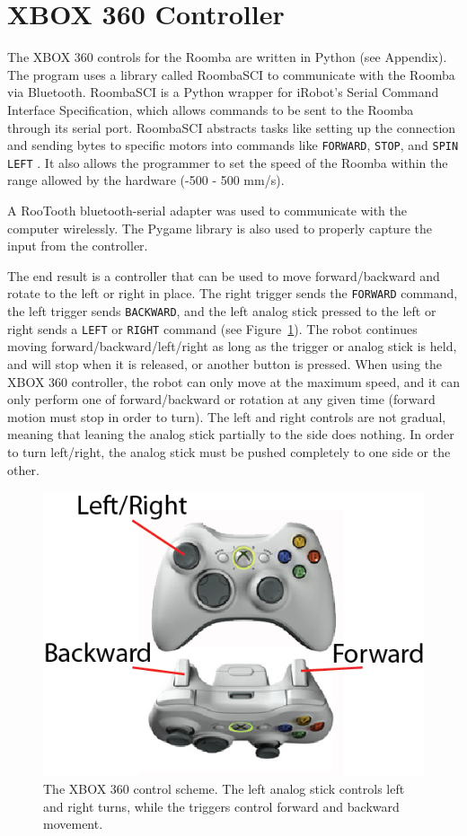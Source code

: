 \documentclass[12pt, letterpaper]{report}
\begin{document}
\section{XBOX 360 Controller}
The XBOX 360 controls for the Roomba are written in Python (see Appendix). The program uses a library called RoombaSCI to communicate with the Roomba via Bluetooth. RoombaSCI is a Python wrapper for iRobot's Serial Command Interface Specification, which allows commands to be sent to the Roomba through its serial port. RoombaSCI abstracts tasks like setting up the connection and sending bytes to specific motors into commands like \texttt{FORWARD}, \texttt{STOP}, and \texttt{SPIN LEFT} \cite{RoombaSCI}. It also allows the programmer to set the speed of the Roomba within the range allowed by the hardware (-500 - 500 mm/s)\cite{iRobot}.

A RooTooth bluetooth-serial adapter was used to communicate with the computer wirelessly. The Pygame library is also used to properly capture the input from the controller. 

The end result is a controller that can be used to move forward/backward and rotate to the left or right in place. The right trigger sends the \texttt{FORWARD} command, the left trigger sends \texttt{BACKWARD}, and the left analog stick pressed to the left or right sends a \texttt{LEFT} or \texttt{RIGHT} command (see Figure~\ref{xbox_diagram}). The robot continues moving forward/backward/left/right as long as the trigger or analog stick is held, and will stop when it is released, or another button is pressed. When using the XBOX 360 controller, the robot can only move at the maximum speed, and it can only perform one of forward/backward or rotation at any given time (forward motion must stop in order to turn). The left and right controls are not gradual, meaning that leaning the analog stick partially to the side does nothing. In order to turn left/right, the analog stick must be pushed completely to one side or the other.

\begin{figure}[h!]
	\centering
	\includegraphics[scale=0.4]{images/xbox_diagram}
	\caption{The XBOX 360 control scheme. The left analog stick controls left and right turns, while the triggers control forward and backward movement.}
	\label{xbox_diagram}
\end{figure}
\end{document}
